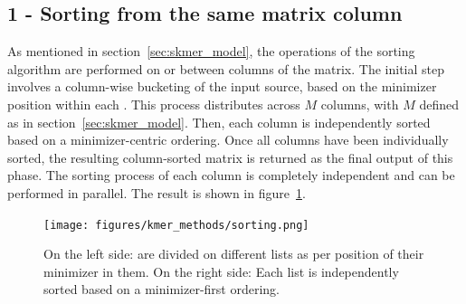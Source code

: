 \subsection{1 - Sorting \kmers from the same matrix column}
\label{sec:skmersorting}
As mentioned in section~\ref{sec:skmer_model}, the operations of the sorting algorithm are performed on or between columns of the \kmer matrix.
The initial step involves a column-wise bucketing of the input \kmer source, based on the minimizer position within each \kmer. This process distributes \kmers across $M$ columns, with $M$ defined as in section~\ref{sec:skmer_model}. Then, each column is independently sorted based on a minimizer-centric ordering. Once all columns have been individually sorted, the resulting column-sorted matrix is returned as the final output of this phase. The sorting process of each column is completely independent and can be performed in parallel. The result is shown in figure~\ref{fig:skmer_sorting}.

\begin{figure}[H]
	\centering
	\texttt{[image: figures/kmer\_methods/sorting.png]}
	\caption[Sorting \kmers by minimizer-first order and divided on minimizer position.]{On the left side: \kmers are divided on different lists as per position of their minimizer in them. On the right side: Each list is independently sorted based on a minimizer-first ordering.}
	\label{fig:skmer_sorting}
\end{figure}


